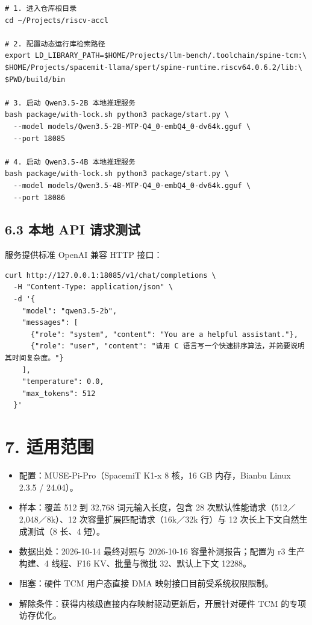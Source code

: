\documentclass[10pt,a4paper,fontset=none]{ctexart}
\begin{document}
\begin{Verbatim}[breaklines=true, breakanywhere=true, fontsize=\small]
# 1. 进入仓库根目录
cd ~/Projects/riscv-accl

# 2. 配置动态运行库检索路径
export LD_LIBRARY_PATH=$HOME/Projects/llm-bench/.toolchain/spine-tcm:\
$HOME/Projects/spacemit-llama/spert/spine-runtime.riscv64.0.6.2/lib:\
$PWD/build/bin

# 3. 启动 Qwen3.5-2B 本地推理服务
bash package/with-lock.sh python3 package/start.py \
  --model models/Qwen3.5-2B-MTP-Q4_0-embQ4_0-dv64k.gguf \
  --port 18085

# 4. 启动 Qwen3.5-4B 本地推理服务
bash package/with-lock.sh python3 package/start.py \
  --model models/Qwen3.5-4B-MTP-Q4_0-embQ4_0-dv64k.gguf \
  --port 18086
\end{Verbatim}

\subsection{6.3 本地 API 请求测试}
服务提供标准 OpenAI 兼容 HTTP 接口：

\begin{Verbatim}[breaklines=true, breakanywhere=true, fontsize=\small,
  formatcom=\xeCJKsetup{CJKecglue={}}]
curl http://127.0.0.1:18085/v1/chat/completions \
  -H "Content-Type: application/json" \
  -d '{
    "model": "qwen3.5-2b",
    "messages": [
      {"role": "system", "content": "You are a helpful assistant."},
      {"role": "user", "content": "请用 C 语言写一个快速排序算法，并简要说明其时间复杂度。"}
    ],
    "temperature": 0.0,
    "max_tokens": 512
  }'
\end{Verbatim}

\section{7. 适用范围}

\begin{itemize}
  \item 配置：MUSE-Pi-Pro（SpacemiT K1-x 8 核，16 GB 内存，Bianbu Linux 2.3.5 / 24.04）。
  \item 样本：覆盖 512 到 32,768 词元输入长度，包含 28 次默认性能请求（512／2,048／8k）、12 次容量扩展匹配请求（16k／32k 行）与 12 次长上下文自然生成测试（8 长、4 短）。
  \item 数据出处：2026-10-14 最终对照与 2026-10-16 容量补测报告；配置为 r3 生产构建、4 线程、F16 KV、批量与微批 32、默认上下文 12288。
  \item 阻塞：硬件 TCM 用户态直接 DMA 映射接口目前受系统权限限制。
  \item 解除条件：获得内核级直接内存映射驱动更新后，开展针对硬件 TCM 的专项访存优化。
\end{itemize}
\end{document}
